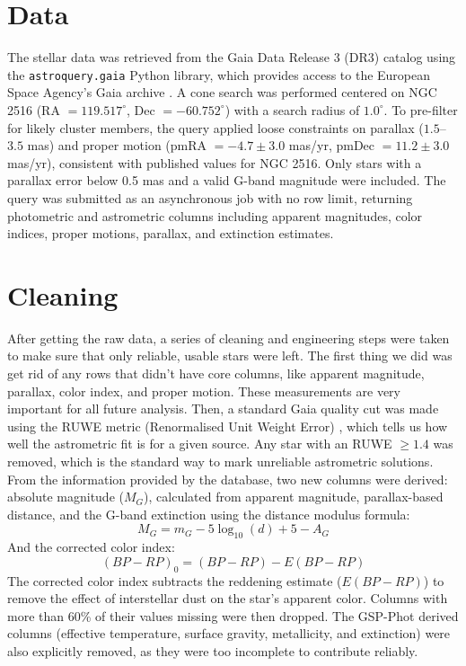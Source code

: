 \documentclass[12pt]{article}
\begin{document}
\section{Data}
The stellar data was retrieved from the Gaia Data Release 3 (DR3) \cite{gaia_dr3} catalog using the \texttt{astroquery.gaia} \cite{astroquery_gaia} Python library, which provides access to the European Space Agency's Gaia archive \cite{gaia_archive}. A cone search was performed centered on NGC 2516 (RA $= 119.517^{\circ}$, Dec $= -60.752^{\circ}$) with a search radius of $1.0^{\circ}$. To pre-filter for likely cluster members, the query applied loose constraints on parallax ($1.5$--$3.5$ mas) and proper motion (pmRA $= -4.7 \pm 3.0$ mas/yr, pmDec $= 11.2 \pm 3.0$ mas/yr), consistent with published values for NGC 2516. Only stars with a parallax error below 0.5 mas and a valid G-band magnitude were included. The query was submitted as an asynchronous job with no row limit, returning photometric and astrometric columns including apparent magnitudes, color indices, proper motions, parallax, and extinction estimates.

\section{Cleaning}
After getting the raw data, a series of cleaning and engineering steps were taken to make sure that only reliable, usable stars were left. The first thing we did was get rid of any rows that didn't have core columns, like apparent magnitude, parallax, color index, and proper motion. These measurements are very important for all future analysis. Then, a standard Gaia quality cut was made using the RUWE metric (Renormalised Unit Weight Error) \cite{pearce2022ruwe}, which tells us how well the astrometric fit is for a given source. Any star with an RUWE $\geqslant 1.4$ was removed, which is the standard way to mark unreliable astrometric solutions. From the information provided by the database, two new columns were derived: absolute magnitude ($M_G$), calculated from apparent magnitude, parallax-based distance, and the G-band extinction using the distance modulus formula:
\begin{equation}
    M_G = m_G - 5\log_{10}(d) + 5 - A_G
\end{equation}
And the corrected color index:
\begin{equation}
    (BP - RP)_0 = (BP - RP) - E(BP-RP)
\end{equation}
The corrected color index subtracts the reddening estimate ($E(BP-RP)$) to remove the effect of interstellar dust on the star's apparent color. Columns with more than 60\% of their values missing were then dropped. The GSP-Phot derived columns (effective temperature, surface gravity, metallicity, and extinction) were also explicitly removed, as they were too incomplete to contribute reliably.
\end{document}
